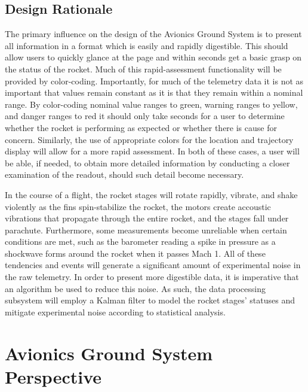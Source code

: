\documentclass[journal,10pt,onecolumn,compsoc]{IEEEtran}
\begin{document}
	\subsection{Design Rationale}
		\noindent The primary influence on the design of the Avionics Ground System is to present all information in a format which is easily and rapidly digestible.
		This should allow users to quickly glance at the page and within seconds get a basic grasp on the status of the rocket.
		Much of this rapid-assessment functionality will be provided by color-coding.
		Importantly, for much of the telemetry data it is not as important that values remain constant as it is that they remain within a nominal range. 
		By color-coding nominal value ranges to green, warning ranges to yellow, and danger ranges to red it should only take seconds for a user to determine whether the rocket is performing as expected or whether there is cause for concern.
		Similarly, the use of appropriate colors for the location and trajectory display will allow for a more rapid assessment.
		In both of these cases, a user will be able, if needed, to obtain more detailed information by conducting a closer examination of the readout, should such detail become necessary.

		\noindent In the course of a flight, the rocket stages will rotate rapidly, vibrate, and shake violently as the fins  spin-stabilize the rocket, the motors create accoustic vibrations that propagate through the entire rocket, and the stages fall under parachute.
		Furthermore, some measurements become unreliable when certain conditions are met, such as the barometer reading a spike in pressure as a shockwave forms around the rocket when it passes Mach 1.
		All of these tendencies and events will generate a significant amount of experimental noise in the raw telemetry.
		In order to present more digestible data, it is imperative that an algorithm be used to reduce this noise.
		As such, the data processing subsystem will employ a Kalman filter to model the rocket stages' statuses and mitigate experimental noise according to statistical analysis.
		
\newpage


\section{Avionics Ground System Perspective}
\end{document}
